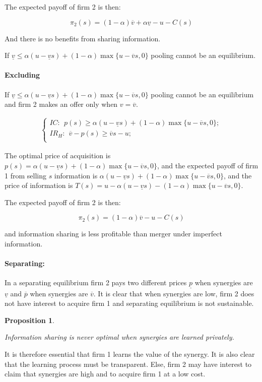 \documentclass[a4paper,leqno]{article}%
\newtheorem{prop}{Proposition}
\renewcommand{\a}{\alpha}
\newcommand{\uv}{\underline{v}}
\newcommand{\ov}{\overline{v}}
\newcommand{\up}{\underline{p}}
\newcommand{\op}{\overline{p}}
\begin{document}
The expected payoff of firm 2 is then:

\[
\pi_2(s)=(1-\a) \ov +\a\uv -u-C(s)
\]


And there is no benefits from sharing information. 

If $\uv\leq \a(u-\uv s)+(1-\a)\max\{u-\ov s,0\}$ pooling cannot be an equilibrium. 


\paragraph{Excluding}

If $\uv\leq \a(u-\uv s)+(1-\a)\max\{u-\ov s,0\}$ pooling cannot be an equilibrium and firm 2 makes an offer only when $v=\ov$. 

\begin{align}
\begin{cases}
    IC:~~ p(s)\geq \a(u-\uv s)+(1-\a)\max\{u-\ov s,0\};\\ 
    IR_H:~~ \ov -p(s)\geq \ov s-u;\\ 
\end{cases}
\end{align}

The optimal price of acquisition is $p(s)=\a(u-\uv s)+(1-\a)\max\{u-\ov s,0\}$, and the expected payoff of firm 1 from selling $s$ information is $\a(u-\uv s)+(1-\a)\max\{u-\ov s,0\}$, and the price of information is $T(s)=u-\a(u-\uv s)-(1-\a)\max\{u-\ov s,0\}$.


The expected payoff of firm 2 is then:

\[
\pi_2(s)=(1-\a) \ov-u-C(s)
\]

and information sharing is less profitable than merger under imperfect information.



\paragraph{Separating:}

\medskip  

In a separating equilibrium firm 2 pays two different prices $\up$ when synergies are $\uv$ and $\op$ when synergies are $\ov$. It is clear that when synergies are low, firm 2 does not have interest to acquire firm 1 and separating equilibrium is not sustainable.

\medskip

\begin{prop}~~

Information sharing is never optimal when synergies are learned privately.

\end{prop}

It is therefore essential that firm 1 learns the value of the synergy. It is also clear that the learning process must be transparent. Else, firm 2 may have interest to claim that synergies are high and to acquire firm 1 at a low cost.
\end{document}
